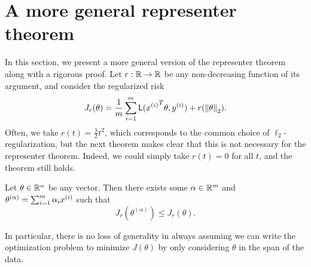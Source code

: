 \documentclass{article}
\newcommand{\loss}{\mathsf{L}}
\begin{document}
\section{A more general representer theorem}

\label{appendix:representer}

In this section, we present a more general version of the representer
theorem along with a rigorous proof. Let $r : \mathbb{R} \to \mathbb{R}$ be any
non-decreasing function of its argument, and consider the regularized
risk
\begin{equation}
  \label{eqn:general-regularized-risk}
  J_r(\theta) = \frac{1}{m} \sum_{i=1}^m \loss(\xsi^T \theta, \ysi)
  + r(\ltwo{\theta}).
\end{equation}
Often, we take $r(t) = \frac{\lambda}{2} t^2$, which corresponds to the
common choice of $\ell_2$-regularization, but the next theorem
makes clear that this is not necessary for the representer theorem.
Indeed, we could simply take $r(t) = 0$ for all $t$, and the theorem
still holds.
\begin{theorem}
  \label{theorem:real-representer}
  Let $\theta \in \mathbb{R}^n$ be any vector. Then there exists
  some $\alpha \in \mathbb{R}^m$ and
  $\theta^{(\alpha)} = \sum_{i = 1}^m \alpha_i {x^{(i)}}$ such that
  \begin{equation*}
    J_r(\theta^{(\alpha)}) \le J_r(\theta).
  \end{equation*}
\end{theorem}
\noindent
In particular, there is no loss of generality in always assuming we can
write the optimization problem to minimize $J(\theta)$ by only considering
$\theta$ in the span of the data.
\end{document}
